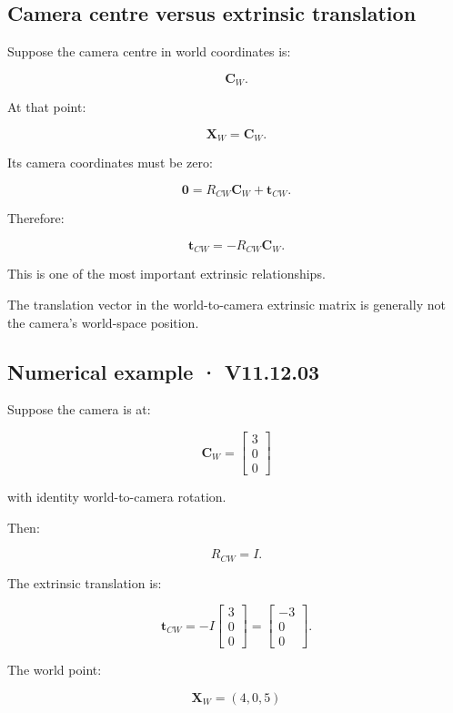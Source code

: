 \subsection{Camera centre versus extrinsic translation}\label{02-foundations-ii-ch035-camera-centre-versus-extrinsic-translation}

Suppose the camera centre in world coordinates is:

\[
 \mathbf C_W.
\]

At that point:

\[
 \mathbf X_W=\mathbf C_W.
\]

Its camera coordinates must be zero:

\[
 \mathbf0=R_{CW}\mathbf C_W+\mathbf t_{CW}.
\]

Therefore:

\[
 \boxed{ \mathbf t_{CW}=-R_{CW}\mathbf C_W }.
\]

This is one of the most important extrinsic relationships.

The translation vector in the world-to-camera extrinsic matrix is generally not the camera's world-space position.

\subsection{Numerical example · V11.12.03}\label{02-foundations-ii-ch035-numerical-example-v11.12.03}

Suppose the camera is at:

\[
 \mathbf C_W= \begin{bmatrix}3\\0\\0\end{bmatrix}
\]

with identity world-to-camera rotation.

Then:

\[
 R_{CW}=I.
\]

The extrinsic translation is:

\[
 \mathbf t_{CW}= -I \begin{bmatrix}3\\0\\0\end{bmatrix} = \begin{bmatrix}-3\\0\\0\end{bmatrix}.
\]

The world point:

\[
 \mathbf X_W=(4,0,5)
\]

